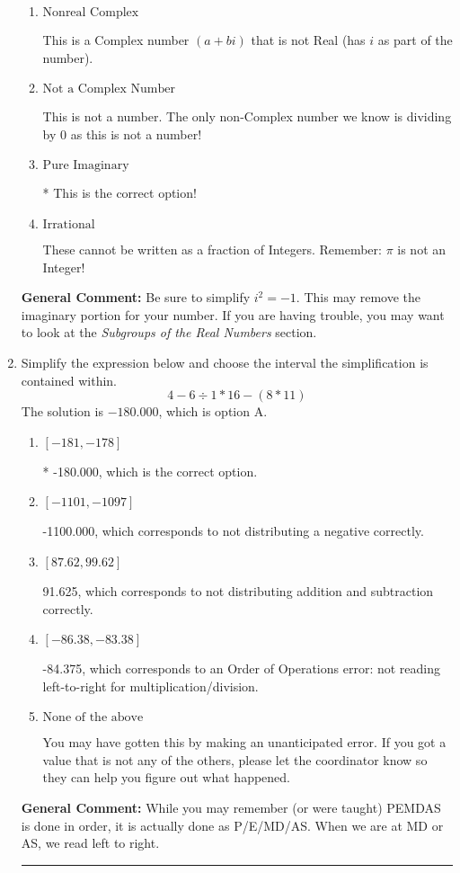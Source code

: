 \documentclass{extbook}[14pt]
\newcommand{\litem}[1]{\item #1

\rule{\textwidth}{0.4pt}}
\begin{document}
\begin{enumerate}
{\begin{enumerate}[label=\Alph*.]
These are numbers that can be written as fraction of Integers (e.g., -2/3 + 5)
\item \( \text{Nonreal Complex} \)

This is a Complex number $(a+bi)$ that is not Real (has $i$ as part of the number).
\item \( \text{Not a Complex Number} \)

This is not a number. The only non-Complex number we know is dividing by 0 as this is not a number!
\item \( \text{Pure Imaginary} \)

* This is the correct option!
\item \( \text{Irrational} \)

These cannot be written as a fraction of Integers. Remember: $\pi$ is not an Integer!
\end{enumerate}

\textbf{General Comment:} Be sure to simplify $i^2 = -1$. This may remove the imaginary portion for your number. If you are having trouble, you may want to look at the \textit{Subgroups of the Real Numbers} section.
}
\litem{
Simplify the expression below and choose the interval the simplification is contained within.
\[ 4 - 6 \div 1 * 16 - (8 * 11) \]The solution is \( -180.000 \), which is option A.\begin{enumerate}[label=\Alph*.]
\item \( [-181, -178] \)

* -180.000, which is the correct option.
\item \( [-1101, -1097] \)

 -1100.000, which corresponds to not distributing a negative correctly.
\item \( [87.62, 99.62] \)

 91.625, which corresponds to not distributing addition and subtraction correctly.
\item \( [-86.38, -83.38] \)

 -84.375, which corresponds to an Order of Operations error: not reading left-to-right for multiplication/division.
\item \( \text{None of the above} \)

 You may have gotten this by making an unanticipated error. If you got a value that is not any of the others, please let the coordinator know so they can help you figure out what happened.
\end{enumerate}

\textbf{General Comment:} While you may remember (or were taught) PEMDAS is done in order, it is actually done as P/E/MD/AS. When we are at MD or AS, we read left to right.
}
\end{enumerate}
\end{document}
